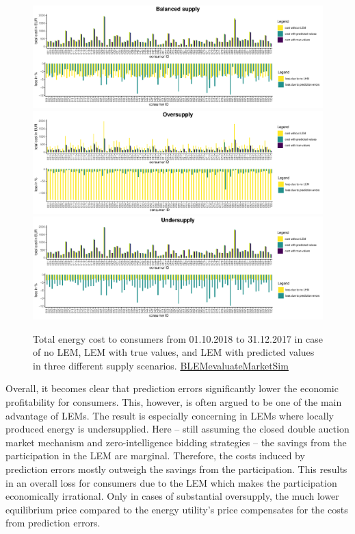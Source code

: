 %
\begin{figure}[H]
    \centering
    \includegraphics[width=\textwidth]{thesis/graphs/marketsimulation/totalenergycost_balanced.pdf}\\\vspace{.6cm}
    \includegraphics[width=\textwidth]{thesis/graphs/marketsimulation/totalenergycost_oversupply.pdf}\\\vspace{.6cm}
    \includegraphics[width=\textwidth]{thesis/graphs/marketsimulation/totalenergycost_undersupply.pdf}
    \caption[Total energy cost to consumers in different supply scenarios]{Total energy cost to consumers from 01.10.2018 to 31.12.2017 in case of no LEM, LEM with true values, and LEM with predicted values in three different supply scenarios. \quantnet\href{https://github.com/QuantLet/BLEM/tree/master/BLEMevaluateMarketSim}{BLEMevaluateMarketSim}}
    \label{Fig:total_energycost}
\end{figure}
%

\newpage
Overall, it becomes clear that prediction errors significantly lower the economic profitability for consumers. This, however, is often argued to be one of the main advantage of LEMs. The result is especially concerning in LEMs where locally produced energy is undersupplied. Here -- still assuming the closed double auction market mechanism and zero-intelligence bidding strategies -- the savings from the participation in the LEM are marginal. Therefore, the costs induced by prediction errors mostly outweigh the savings from the participation. This results in an overall loss for consumers due to the LEM which makes the participation economically irrational. Only in cases of substantial oversupply, the much lower equilibrium price compared to the energy utility's price compensates for the costs from prediction errors.

